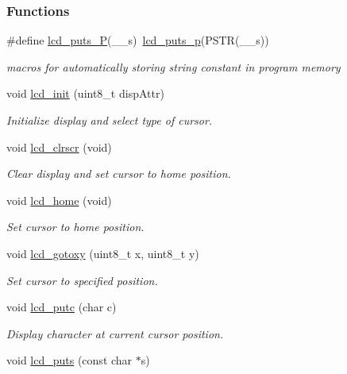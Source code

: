 \subsubsection*{Functions}
\begin{DoxyCompactItemize}
\item 
\#define \hyperlink{a00006_ga4f1928f1515e21422d5a33af2949f2f7}{lcd\+\_\+puts\+\_\+P}(\+\_\+\+\_\+s)~\hyperlink{a00006_ga9022a24a56a9b15681f62eb6ba77e5de}{lcd\+\_\+puts\+\_\+p}(P\+S\+TR(\+\_\+\+\_\+s))
\begin{DoxyCompactList}\small\item\em macros for automatically storing string constant in program memory \end{DoxyCompactList}\item 
void \hyperlink{a00006_ga9af28b2779326b63ff4356e2b1828984}{lcd\+\_\+init} (uint8\+\_\+t disp\+Attr)
\begin{DoxyCompactList}\small\item\em Initialize display and select type of cursor. \end{DoxyCompactList}\item 
void \hyperlink{a00006_gaf8da853dba4b9d5f2aea4e294444e14d}{lcd\+\_\+clrscr} (void)
\begin{DoxyCompactList}\small\item\em Clear display and set cursor to home position. \end{DoxyCompactList}\item 
void \hyperlink{a00006_ga3aabf730aa4e0393bb5c959583c00a8e}{lcd\+\_\+home} (void)
\begin{DoxyCompactList}\small\item\em Set cursor to home position. \end{DoxyCompactList}\item 
void \hyperlink{a00006_gadbf47a5efdf02367ded1ebf8f9edb5fe}{lcd\+\_\+gotoxy} (uint8\+\_\+t x, uint8\+\_\+t y)
\begin{DoxyCompactList}\small\item\em Set cursor to specified position. \end{DoxyCompactList}\item 
void \hyperlink{a00006_gafa7e36b95c43d603f510273ad077cbbe}{lcd\+\_\+putc} (char c)
\begin{DoxyCompactList}\small\item\em Display character at current cursor position. \end{DoxyCompactList}\item 
void \hyperlink{a00006_ga8ffdfcac7638368ff04364c14984266e}{lcd\+\_\+puts} (const char $\ast$s)

\end{DoxyCompactItemize}
